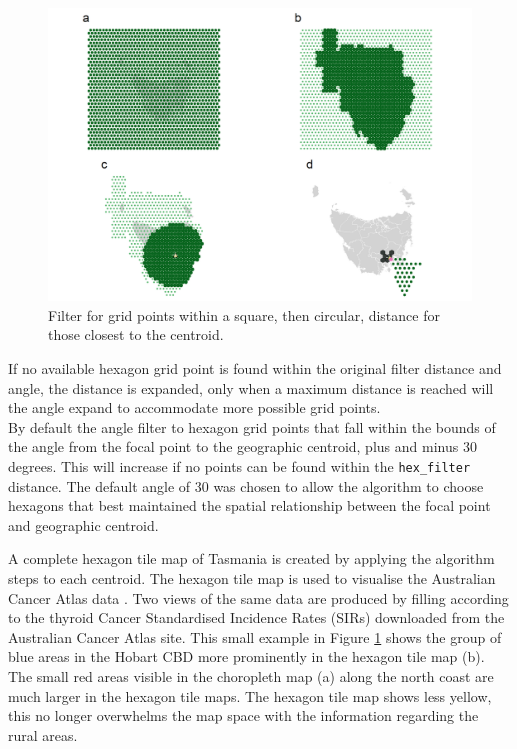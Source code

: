 \begin{Schunk}
\begin{figure}
\includegraphics[width=1.2\linewidth]{kobakian-cook_files/figure-latex/filterprocess-1} \caption[Filter for grid points within a square, then circular, distance for those closest to the centroid]{Filter for grid points within a square, then circular, distance for those closest to the centroid.}\label{fig:filterprocess}
\end{figure}
\end{Schunk}

If no available hexagon grid point is found within the original filter
distance and angle, the distance is expanded, only when a maximum
distance is reached will the angle expand to accommodate more possible
grid points.\\
By default the angle filter to hexagon grid points that fall within the
bounds of the angle from the focal point to the geographic centroid,
plus and minus 30 degrees. This will increase if no points can be found
within the \texttt{hex\_filter} distance. The default angle of 30 was
chosen to allow the algorithm to choose hexagons that best maintained
the spatial relationship between the focal point and geographic
centroid.

A complete hexagon tile map of Tasmania is created by applying the
algorithm steps to each centroid. The hexagon tile map is used to
visualise the Australian Cancer Atlas data \citep{TACA}. Two views of
the same data are produced by filling according to the thyroid Cancer
Standardised Incidence Rates (SIRs) downloaded from the Australian
Cancer Atlas site. This small example in Figure \ref{fig:filterprocess}
shows the group of blue areas in the Hobart CBD more prominently in the
hexagon tile map (b). The small red areas visible in the choropleth map
(a) along the north coast are much larger in the hexagon tile maps. The
hexagon tile map shows less yellow, this no longer overwhelms the map
space with the information regarding the rural areas.

